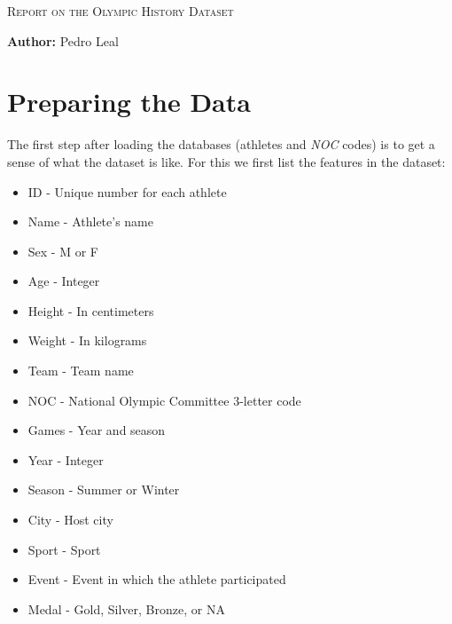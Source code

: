 \documentclass[11pt]{article} %
\begin{document}


\newcommand{\HRule}{\rule{\linewidth}{0.5mm}} %

\begin{center} %
\textsc{\LARGE Report on the Olympic History Dataset}\\[1.5cm] %
\end{center}
\begin{flushright}
{\bf Author:} Pedro Leal
\end{flushright}



\section{Preparing the Data}

The first step after loading the databases (athletes and {\it NOC} codes) is to get a sense of what the dataset is like. For this we first list the features in the dataset:

\begin{itemize}
\setlength\itemsep{0.05em}
    \item ID -  Unique number for each athlete
    \item Name - Athlete's name
    \item Sex - M or F
    \item Age - Integer
    \item Height - In centimeters
    \item Weight - In kilograms
    \item Team - Team name
    \item NOC - National Olympic Committee 3-letter code
    \item Games - Year and season
    \item Year - Integer
    \item Season - Summer or Winter
    \item City - Host city
    \item Sport - Sport
    \item Event - Event in which the athlete participated
    \item Medal - Gold, Silver, Bronze, or NA
\end{itemize}
\end{document}
